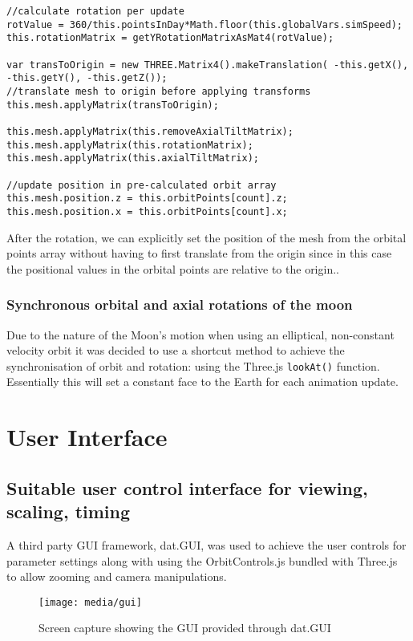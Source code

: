 \documentclass[titlepage]{article}
\begin{document}
\begin{lstlisting}[caption=Code taken from Earth.js]
//calculate rotation per update
rotValue = 360/this.pointsInDay*Math.floor(this.globalVars.simSpeed);
this.rotationMatrix = getYRotationMatrixAsMat4(rotValue);

var transToOrigin = new THREE.Matrix4().makeTranslation( -this.getX(), -this.getY(), -this.getZ());
//translate mesh to origin before applying transforms
this.mesh.applyMatrix(transToOrigin);

this.mesh.applyMatrix(this.removeAxialTiltMatrix);
this.mesh.applyMatrix(this.rotationMatrix);
this.mesh.applyMatrix(this.axialTiltMatrix);

//update position in pre-calculated orbit array
this.mesh.position.z = this.orbitPoints[count].z;
this.mesh.position.x = this.orbitPoints[count].x;

\end{lstlisting}

After the rotation, we can explicitly set the position of the mesh from the orbital points array without having to first translate from the origin since in this case the positional values in the orbital points are relative to the origin..

\subsubsection{Synchronous orbital and axial rotations of the moon}

Due to the nature of the Moon's motion when using an elliptical, non-constant velocity orbit it was decided to use a shortcut method to achieve the synchronisation of orbit and rotation: using the Three.js \texttt{lookAt()} function. Essentially this will set a constant face to the Earth for each animation update.

\section{User Interface}
\subsection{Suitable user control interface for viewing, scaling, timing}
A third party GUI framework, dat.GUI, was used to achieve the user controls for parameter settings along with using the OrbitControls.js bundled with Three.js to allow zooming and camera manipulations.

\begin{figure}[h!]
                \centering
                \texttt{[image: media/gui]}
                \caption{Screen capture showing the GUI provided through dat.GUI}
\end{figure}
\end{document}
